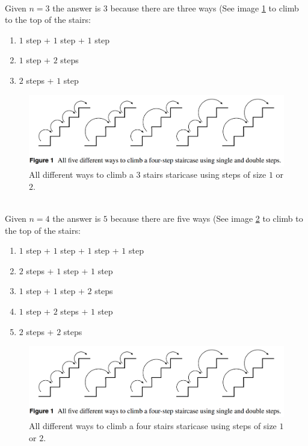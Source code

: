 \begin{example}
	\hfill \\ 
	Given $n = 3$ the answer is $3$ because there are three ways (See image \ref{fig:stair_example_3} to climb to the top of the stairs:
	\begin{enumerate}
		\item $1$ step + $1$ step + $1$ step
		\item $1$ step + $2$ steps
		\item $2$ steps + $1$ step
	\end{enumerate}

\begin{figure}
	\label{fig:stair_example_3}
	\centering
	\includegraphics[scale=0.5]{sources/stairs_climbing/images/3stairs}
	\caption{All different ways to climb a 3 stairs staricase using steps of size $1$ or $2$.}
\end{figure}

\end{example}

\begin{example}
	\hfill \\
	Given $n = 4$ the answer is $5$ because there are five ways (See image \ref{fig:stair_example_5} to climb to the top of the stairs:
	\begin{enumerate}
		\item $1$ step + $1$ step + $1$ step + $1$ step
		\item $2$ steps + $1$ step + $1$ step
		\item $1$ step + $1$ step + $2$ steps 
		\item $1$ step + $2$ steps + $1$ step
		\item $2$ steps +  $2$ steps
	\end{enumerate}

\begin{figure}
	\label{fig:stair_example_5}
	\centering
	\includegraphics[scale=0.5]{sources/stairs_climbing/images/5stairs}
	\caption{All different ways to climb a four stairs staricase using steps of size $1$ or $2$.}
\end{figure}

\end{example}
	

